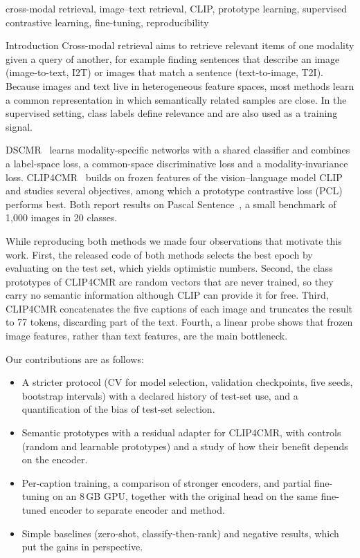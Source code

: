\documentclass[conference]{IEEEtran}
\makeatletter
\def\section{\@startsection{section}{1}{\z@}{2.2ex plus 1ex minus .5ex}{1ex plus .3ex}%
  {\normalfont\fontsize{12}{14}\selectfont\bfseries\scshape\centering}}
\makeatother
\begin{document}
\begin{IEEEkeywords}
cross-modal retrieval, image--text retrieval, CLIP, prototype learning, supervised contrastive learning, fine-tuning, reproducibility
\end{IEEEkeywords}

\section{Introduction}
Cross-modal retrieval aims to retrieve relevant items of one modality given a query of another, for example finding sentences that describe an image (image-to-text, I2T) or images that match a sentence (text-to-image, T2I). Because images and text live in heterogeneous feature spaces, most methods learn a common representation in which semantically related samples are close. In the supervised setting, class labels define relevance and are also used as a training signal.

DSCMR~\cite{dscmr} learns modality-specific networks with a shared classifier and combines a label-space loss, a common-space discriminative loss and a modality-invariance loss. CLIP4CMR~\cite{clip4cmr} builds on frozen features of the vision--language model CLIP~\cite{clip} and studies several objectives, among which a prototype contrastive loss (PCL) performs best. Both report results on Pascal Sentence~\cite{pascal}, a small benchmark of 1,000 images in 20 classes.

While reproducing both methods we made four observations that motivate this work. First, the released code of both methods selects the best epoch by evaluating on the test set, which yields optimistic numbers. Second, the class prototypes of CLIP4CMR are random vectors that are never trained, so they carry no semantic information although CLIP can provide it for free. Third, CLIP4CMR concatenates the five captions of each image and truncates the result to 77 tokens, discarding part of the text. Fourth, a linear probe shows that frozen image features, rather than text features, are the main bottleneck.

Our contributions are as follows:
\begin{itemize}
\item A stricter protocol (CV for model selection, validation checkpoints, five seeds, bootstrap intervals) with a declared history of test-set use, and a quantification of the bias of test-set selection.
\item Semantic prototypes with a residual adapter for CLIP4CMR, with controls (random and learnable prototypes) and a study of how their benefit depends on the encoder.
\item Per-caption training, a comparison of stronger encoders, and partial fine-tuning on an 8\,GB GPU, together with the original head on the same fine-tuned encoder to separate encoder and method.
\item Simple baselines (zero-shot, classify-then-rank) and negative results, which put the gains in perspective.
\end{itemize}
\end{document}
